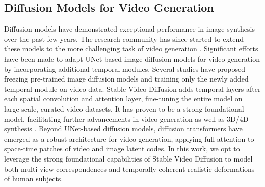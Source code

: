 \subsection{Diffusion Models for Video Generation}
Diffusion models have demonstrated exceptional performance in image synthesis over the past few years. The research community has since started to extend these models to the more challenging task of video generation \cite{zeng2024dawn}. Significant efforts have been made to adapt UNet-based image diffusion models for video generation by incorporating additional temporal modules. Several studies \cite{blattmann2023align, guo2023animatediff} have proposed freezing pre-trained image diffusion models and training only the newly added temporal module on video data. Stable Video Diffusion \cite{blattmann2023stable} adds temporal layers after each spatial convolution and attention layer, fine-tuning the entire model on large-scale, curated video datasets. It has proven to be a strong foundational model, facilitating further advancements in video generation as well as 3D/4D synthesis \cite{voleti2024sv3d, xie2024sv4d}. Beyond UNet-based diffusion models, diffusion transformers \cite{peebles2023scalable, yang2024cogvideox, videoworldsimulators2024} have emerged as a robust architecture for video generation, applying full attention to space-time patches of video and image latent codes. In this work, we opt to leverage the strong foundational capabilities of Stable Video Diffusion to model both multi-view correspondences and temporally coherent realistic deformations of human subjects.